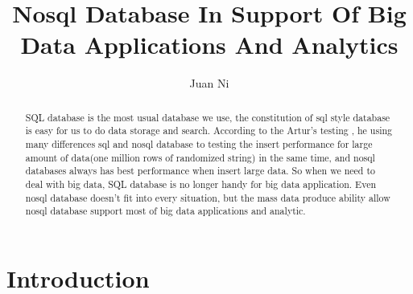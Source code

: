 \documentclass[sigconf]{acmart}
\begin{document}
\title{Nosql Database In Support Of Big Data Applications And Analytics}


\author{Juan Ni}




\begin{abstract}
SQL database is the most usual database we use, the constitution of sql style database is easy for us to do data storage and search. According to the Artur's testing \cite{test:01}, he using many differences sql and nosql database to testing the insert performance for large amount of data(one million rows of randomized string) in the same time, and nosql databases always has best performance when insert large data. So when we need to deal with big data, SQL database is no longer handy for big data application. Even nosql database doesn't fit into every situation, but the mass data produce ability allow nosql database support most of big data applications and analytic.
\end{abstract}



\maketitle

\section{Introduction}
\end{document}
